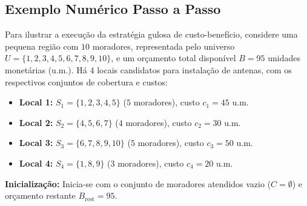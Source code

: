 \subsection{Exemplo Numérico Passo a Passo}

Para ilustrar a execução da estratégia gulosa de custo-benefício, considere uma pequena região com $10$ moradores, representada pelo universo $U = \{1, 2, 3, 4, 5, 6, 7, 8, 9, 10\}$, e um orçamento total disponível $B = 95$ unidades monetárias (u.m.). Há $4$ locais candidatos para instalação de antenas, com os respectivos conjuntos de cobertura e custos:
\begin{itemize}
    \item \textbf{Local 1:} $S_1 = \{1, 2, 3, 4, 5\}$ ($5$ moradores), custo $c_1 = 45$ u.m.
    \item \textbf{Local 2:} $S_2 = \{4, 5, 6, 7\}$ ($4$ moradores), custo $c_2 = 30$ u.m.
    \item \textbf{Local 3:} $S_3 = \{6, 7, 8, 9, 10\}$ ($5$ moradores), custo $c_3 = 50$ u.m.
    \item \textbf{Local 4:} $S_4 = \{1, 8, 9\}$ ($3$ moradores), custo $c_4 = 20$ u.m.
\end{itemize}

\textbf{Inicialização:} Inicia-se com o conjunto de moradores atendidos vazio ($C = \emptyset$) e orçamento restante $B_{\text{rest}} = 95$.

